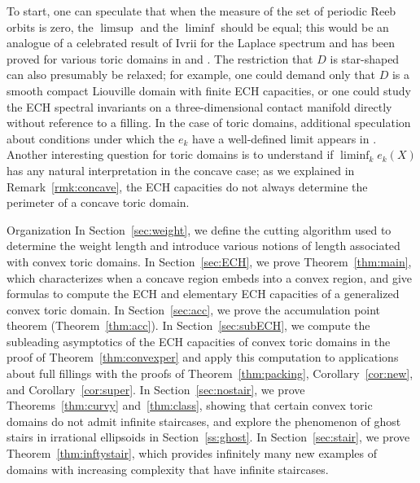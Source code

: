 \documentclass[11pt, reqno]{amsart}
\makeatletter
\def\subsection{\@startsection{subsection}{2}%
  \z@{.75\linespacing\@plus.7\linespacing}{-.5em}%
  {\normalfont\large\bfseries}}
\theoremstyle{remark}
\numberwithin{equation}{subsection}
\numberwithin{figure}{section}
\theoremstyle{customremark}
\makeatother
\begin{document}
To start, one can speculate that when the measure of the set of periodic Reeb orbits is zero, the $\limsup$ and the $\liminf$ should be equal; this would be an analogue of a celebrated result of Ivrii for the Laplace spectrum \cite{ivrii} and has been proved for various toric domains in \cite[Cor. 1, Thm. 3]{Wormleighton} and \cite[Thm. 1.10]{Ruel}.  The restriction that $D$ is star-shaped can also presumably be relaxed; for example, one could demand only that $D$ is a smooth compact Liouville domain with finite ECH capacities, or one could study the ECH spectral invariants on a three-dimensional contact manifold directly without reference to a filling.  In the case of toric domains, additional speculation about conditions under which the $e_k$ have a well-defined limit appears in \cite{Wormleighton}.  Another interesting question for toric domains is to understand if $\liminf_k e_k(X)$ has any natural interpretation in the concave case; as we explained in Remark~\ref{rmk:concave}, the ECH capacities do not always determine the perimeter of a concave toric domain.

\subsection{Organization}
In Section~\ref{sec:weight}, we define the cutting algorithm used to determine the weight length and introduce various notions of length associated with convex toric domains. In Section~\ref{sec:ECH}, we prove Theorem~\ref{thm:main}, which characterizes when a concave region embeds into a convex region, and give formulas to compute the ECH and elementary ECH capacities of a generalized convex toric domain. In Section~\ref{sec:acc}, we prove the accumulation point theorem (Theorem~\ref{thm:acc}). In Section~\ref{sec:subECH}, we compute the subleading asymptotics of the ECH capacities of convex toric domains in the proof of Theorem~\ref{thm:convexper} and apply this computation to applications about full fillings with the proofs of Theorem~\ref{thm:packing}, Corollary~\ref{cor:new}, and Corollary~\ref{cor:super}. In Section~\ref{sec:nostair}, we prove Theorems~\ref{thm:curvy} and~\ref{thm:class}, showing that certain convex toric domains do not admit infinite staircases, and explore the phenomenon of ghost stairs in irrational ellipsoids in Section~\ref{ss:ghost}. In Section~\ref{sec:stair}, we prove Theorem~\ref{thm:inftystair}, which provides infinitely many new examples of domains with increasing complexity that have infinite staircases. 
\end{document}
